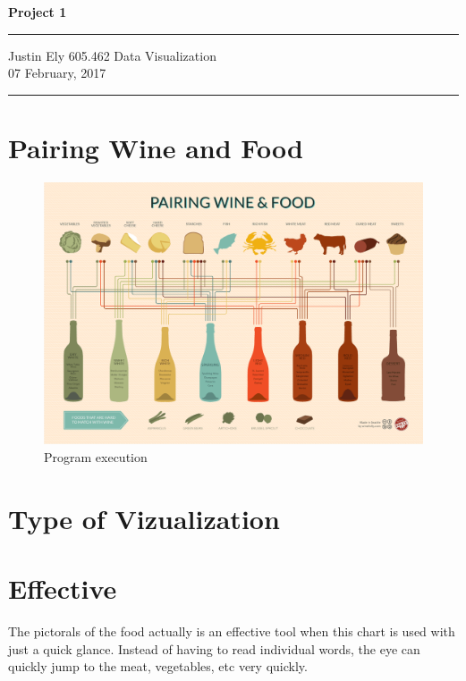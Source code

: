 \documentclass[a4paper,11pt]{article}
\begin{document}
\begin{flushright}

\vspace{1.1cm}

{\bf\Huge Project 1}

\rule{0.25\linewidth}{0.5pt}

\vspace{0.5cm}
Justin Ely
\linebreak
\newline
\footnotesize{605.462 Data Visualization \\}
\vspace{0.5cm}
07 February, 2017
\end{flushright}

\noindent\rule{\linewidth}{1.0pt}


\section{Pairing Wine and Food}

\begin{figure}[h!]
\caption{Program execution} 
\centering
\includegraphics[width=1.1\textwidth]{wine-and-food-pairing-chart.png}
\end{figure}

\section{Type of Vizualization}

\section{Effective}
The pictorals of the food actually is an effective tool when this chart is used with just a quick glance.  Instead of having to read individual words, the eye can quickly jump to the meat, vegetables, etc very quickly.  
\end{document}
